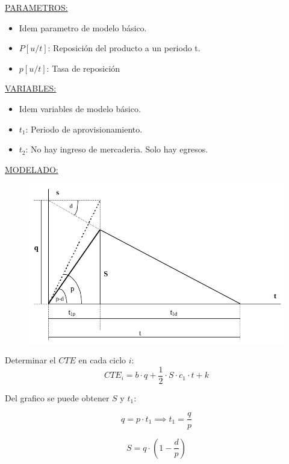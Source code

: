 \documentclass{article}
\begin{document}
\noindent
\underline{PARAMETROS:}
\begin{itemize}
    \item Idem parametro de modelo básico.
    \item \(P[u/t]\): Reposición del producto a un periodo t. 
    \item \(p[u/t]\): Tasa de reposición
\end{itemize}

\noindent
\underline{VARIABLES:}
\begin{itemize}
    \item Idem variables de modelo básico.
    \item \(t_1\): Periodo de aprovisionamiento.
    \item \(t_2\): No hay ingreso de mercaderia. Solo hay egresos.
\end{itemize}

\noindent
\underline{MODELADO:}

\begin{figure}[h!]
    \includegraphics[width=\linewidth]{imagenes/stock-modelo-no-instantaneo.png}
\end{figure}

Determinar el \(CTE\) en cada ciclo \(i\):
\begin{equation}
    CTE_i= b \cdot q + \frac{1}{2} \cdot S \cdot c_1 \cdot t + k
\end{equation}

Del grafico se puede obtener \(S\) y \(t_1\):

\begin{equation}
    q= p \cdot t_1 \implies t_1 = \frac{q}{p}
\end{equation}

\begin{equation}
    S = q \cdot (1 - \frac{d}{p})
\end{equation}
\end{document}
